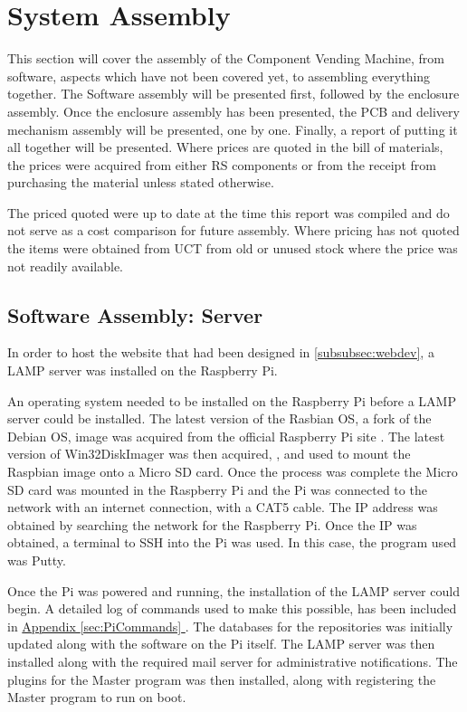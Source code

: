 \documentclass[a4paper,11pt]{article}
\newcommand*{\fullref}[1]{\hyperref[{#1}]{\Appendixautorefname  \ref*{#1} \nameref*{#1}}}
\newcommand*{\Appendixautorefname}{Appendix }
\numberwithin{figure}{section}
\numberwithin{table}{section}
\begin{document}
\newpage

\section{System Assembly}\thispagestyle{sectionstart}
This section will cover the assembly of the Component Vending Machine, from software, aspects which have not been covered yet, to assembling everything together. The Software assembly will be presented first, followed by the enclosure assembly. Once the enclosure assembly has been presented, the PCB and delivery mechanism assembly will be presented, one by one. Finally, a report of putting it all together will be presented. Where prices are quoted in the bill of materials, the prices were acquired from either RS components \cite{rsonline} or from the receipt from purchasing the material unless stated otherwise.

The priced quoted were up to date at the time this report was compiled and do not serve as a cost comparison for future assembly. Where pricing has not quoted the items were obtained from UCT from old or unused stock where the price was not readily available.

\subsection{Software Assembly: Server}

In order to host the website that had been designed in \autoref{subsubsec:webdev}, a LAMP server was installed on the Raspberry Pi.

An operating system needed to be installed on the Raspberry Pi before a LAMP server could be installed. The latest version of the Rasbian OS, a fork of the Debian OS, image was acquired from the official Raspberry Pi site \cite{raspbian}. The latest version of Win32DiskImager was then acquired, \cite{diskimage}, and used to mount the Raspbian image onto a Micro SD card. Once the process was complete the Micro SD card was mounted in the Raspberry Pi and the Pi was connected to the network with an internet connection, with a CAT5 cable. The IP address was obtained by searching the network for the Raspberry Pi. Once the IP was obtained, a terminal to SSH into the Pi was used. In this case, the program used was Putty.

Once the Pi was powered and running, the installation of the LAMP server could begin. A detailed log of commands used to make this possible, has been included in \fullref{sec:PiCommands}. The databases for the repositories was initially updated along with the software on the Pi itself. The LAMP server was then installed along with the required mail server for administrative notifications. The plugins for the Master program was then installed, along with registering the Master program to run on boot.
\end{document}
